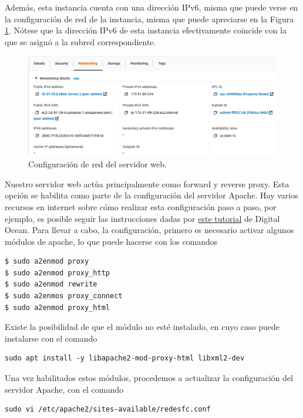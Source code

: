 \documentclass{article}
\begin{document}
Adem\'as, esta instancia cuenta con una direcci\'on IPv6,
misma que puede verse en la configuraci\'on de red de la
instancia, misma que puede apreciarse en la Figura
\ref{fig:web-ipv6}.   N\'otese que la direcci\'on IPv6
de esta instancia efectivamente coincide con la que se
asign\'o a la subred correspondiente.

\begin{figure}[H]
  \centering
  \includegraphics[width=\textwidth]{web/ipv6}
  \caption{Configuraci\'on de red del servidor web.}
  \label{fig:web-ipv6}
\end{figure}

Nuestro servidor web act\'ua principalmente como
forward y reverse proxy.   Esta opci\'on se habilita
como parte de la configuraci\'on del servidor Apache.
Hay varios recursos en internet sobre c\'omo realizar
esta configuraci\'on paso a paso, por ejemplo, es
posible seguir las instrucciones dadas por
\href{https://www.digitalocean.com/community/tutorials/how-to-use-apache-http-server-as-reverse-proxy-using-mod_proxy-extension}{este
tutorial} de Digital Ocean.   Para llevar a cabo,
la configuraci\'on, primero es necesario activar
algunos m\'odulos de apache, lo que puede hacerse
con los comandos
\begin{lstlisting}
$ sudo a2enmod proxy
$ sudo a2enmod proxy_http
$ sudo a2enmod rewrite
$ sudo a2enmos proxy_connect
$ sudo a2enmod proxy_html
\end{lstlisting}

Existe la posibilidad de que el m\'odulo no est\'e
instalado, en cuyo caso puede instalarse con el
comando
\begin{lstlisting}
sudo apt install -y libapache2-mod-proxy-html libxml2-dev
\end{lstlisting}

Una vez habilitados estos m\'odulos, procedemos
a actualizar la configuraci\'on del servidor
Apache, con el comando
\begin{lstlisting}
sudo vi /etc/apache2/sites-available/redesfc.conf
\end{lstlisting}
\end{document}
